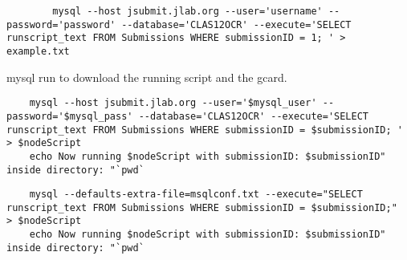    \begin{lstlisting}
        mysql --host jsubmit.jlab.org --user='username' --password='password' --database='CLAS12OCR' --execute='SELECT runscript_text FROM Submissions WHERE submissionID = 1; ' > example.txt
    \end{lstlisting}
    
    mysql run to download the running script and the gcard.
    \begin{lstlisting}
    mysql --host jsubmit.jlab.org --user='$mysql_user' --password='$mysql_pass' --database='CLAS12OCR' --execute='SELECT runscript_text FROM Submissions WHERE submissionID = $submissionID; ' > $nodeScript
    echo Now running $nodeScript with submissionID: $submissionID" inside directory: "`pwd`
    \end{lstlisting}
    
    \begin{lstlisting}
    mysql --defaults-extra-file=msqlconf.txt --execute="SELECT runscript_text FROM Submissions WHERE submissionID = $submissionID;"  > $nodeScript
    echo Now running $nodeScript with submissionID: $submissionID" inside directory: "`pwd`
    \end{lstlisting}
    
\fi
